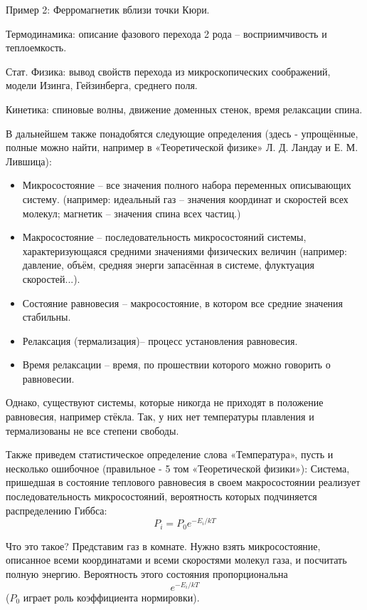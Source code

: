 \documentclass[a4paper, 12pt]{article}
\begin{document}
	Пример 2:  Ферромагнетик вблизи точки Кюри.
	
	Термодинамика: описание фазового перехода 2 рода – восприимчивость и теплоемкость.
	
	Стат. Физика: вывод свойств  перехода из микроскопических соображений, модели Изинга, Гейзинберга, среднего  поля.
	
	Кинетика: спиновые волны, движение доменных стенок, время релаксации спина.
	
	В дальнейшем также понадобятся следующие определения (здесь - упрощённые, полные можно найти, например в «Теоретической физике» Л. Д. Ландау и Е. М. Лившица):
	\begin{itemize}
		\item Микросостояние – все значения полного набора переменных описывающих систему. 
		\newline
		(например: идеальный газ – значения координат и скоростей всех молекул; магнетик – значения спина всех частиц.)
		\item Макросостояние – последовательность микросостояний системы, характеризующаяся средними значениями физических величин (например: давление, объём, средняя энерги запасённая в системе, флуктуация скоростей...).
		\item Состояние равновесия – макросостояние, в котором все средние значения стабильны.
		\item Релаксация (термализация)– процесс установления равновесия.
		\item Время релаксации – время, по прошествии которого можно говорить о равновесии. 
	\end{itemize}
	
	Однако, существуют системы, которые никогда не приходят в положение равновесия, например стёкла. Так, у них нет температуры плавления и термализованы не все степени свободы.
	
	Также приведем статистическое определение слова «Температура», пусть и несколько ошибочное (правильное - 5 том «Теоретической физики»):
	\newline
	Система, пришедшая в состояние теплового равновесия в своем макросостоянии реализует последовательность микросостояний, вероятность которых подчиняется распределению Гиббса: 
	\begin{equation*}
		P_i=P_0 e^{-E_i/kT}
	\end{equation*}
	
	Что это такое? Представим газ в комнате. Нужно взять микросостояние, описанное всеми координатами и всеми скоростями молекул газа, и посчитать полную энергию. Вероятность этого состояния пропорциональна 
	\begin{equation*}
		e^{-E_i/kT} 
	\end{equation*}
	($P_0$ играет роль коэффициента нормировки). 
	
\end{document}
